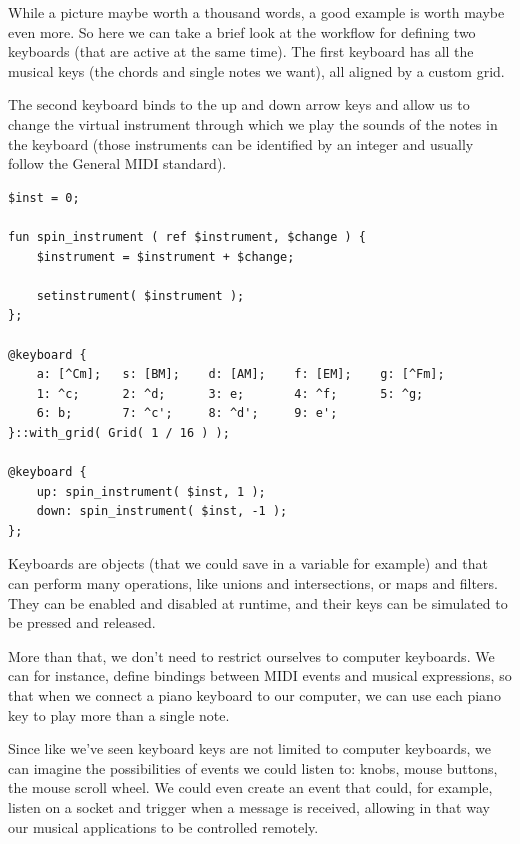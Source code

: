 \documentclass[a4paper,UKenglish,cleveref, autoref]{oasics-v2019}
\begin{document}
While a picture maybe worth a thousand words, a good example is worth maybe even more. So here we can take a brief look at the workflow for defining two keyboards (that are active at the same time). The first keyboard has all the musical keys (the chords and single notes we want), all aligned by a custom grid.

The second keyboard binds to the up and down arrow keys and allow us to change the virtual instrument through which we play the sounds of the notes in the keyboard (those instruments can be identified by an integer and usually follow the General MIDI standard\cite{GeneralMIDI}).

\begin{lstlisting}[caption={Creating a keyboard that can play multiple instruments},label=list:9,captionpos=t,abovecaptionskip=-\medskipamount]
$inst = 0;

fun spin_instrument ( ref $instrument, $change ) {
    $instrument = $instrument + $change;
    
    setinstrument( $instrument );
};

@keyboard {
    a: [^Cm];   s: [BM];    d: [AM];    f: [EM];    g: [^Fm];
    1: ^c;      2: ^d;      3: e;       4: ^f;      5: ^g;
    6: b;       7: ^c';     8: ^d';     9: e';
}::with_grid( Grid( 1 / 16 ) );

@keyboard {
    up: spin_instrument( $inst, 1 );
    down: spin_instrument( $inst, -1 );
};
\end{lstlisting}

Keyboards are objects (that we could save in a variable for example) and that can perform many operations, like unions and intersections, or maps and filters. They can be enabled and disabled at runtime, and their keys can be simulated to be pressed and released.

More than that, we don't need to restrict ourselves to computer keyboards. We can for instance, define bindings between MIDI events and musical expressions, so that when we connect a piano keyboard to our computer, we can use each piano key to play more than a single note.

Since like we've seen keyboard keys are not limited to computer keyboards, we can imagine the possibilities of events we could listen to: knobs, mouse buttons, the mouse scroll wheel. We could even create an event that could, for example, listen on a socket and trigger when a message is received, allowing in that way our musical applications to be controlled remotely.
\end{document}
